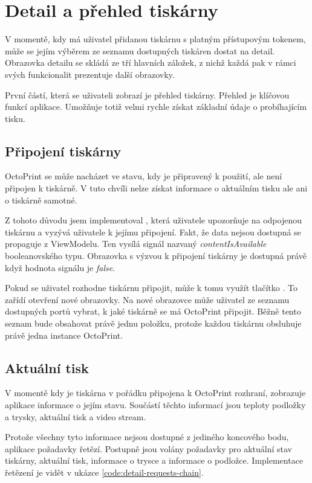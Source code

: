 \section{Detail a přehled tiskárny}

V momentě, kdy má uživatel přidanou tiskárnu s platným přístupovým tokenem, může se jejím výběrem ze seznamu dostupných tiskáren dostat na detail.
Obrazovka detailu se skládá ze tří hlavních záložek, z nichž každá pak v rámci svých funkcionalit prezentuje další obrazovky.

První částí, která se uživateli zobrazí je přehled tiskárny.
Přehled je klíčovou funkcí aplikace.
Umožňuje totiž velmi rychle získat základní údaje o probíhajícím tisku.

\subsection{Připojení tiskárny}

OctoPrint se může nacházet ve stavu, kdy je připravený k použití, ale není připojen k tiskárně.
V tuto chvíli nelze získat informace o aktuálním tisku ale ani o tiskárně samotné.

Z tohoto důvodu jsem implementoval , která uživatele upozorňuje na odpojenou tiskárnu a vyzývá uživatele k jejímu připojení.
Fakt, že data nejsou dostupná se propaguje z ViewModelu.
Ten vysílá signál nazvaný \textit{contentIsAvailable} booleanovského typu.
Obrazovka s výzvou k připojení tiskárny je dostupná právě když hodnota signálu je \textit{false}.

Pokud se uživatel rozhodne tiskárnu připojit, může k tomu využít tlačítko .
To zařídí otevření nové obrazovky.
Na nové obrazovce může uživatel ze seznamu dostupných portů vybrat, k jaké tiskárně se má OctoPrint připojit.
Běžně tento seznam bude obsahovat právě jednu položku, protože každou tiskárnu obsluhuje právě jedna instance OctoPrint.

\subsection{Aktuální tisk}

V momentě kdy je tiskárna v pořádku připojena k OctoPrint rozhraní, zobrazuje aplikace informace o jejím stavu.
Součástí těchto informací jsou teploty podložky a trysky, aktuální tisk a video stream.

Protože všechny tyto informace nejsou dostupné z jediného koncového bodu, aplikace požadavky řetězí.
Postupně jsou volány požadavky pro aktuální stav tiskárny, aktuální tisk, informace o trysce a informace o podložce.
Implementace řetězení je vidět v ukázce \ref{code:detail-requests-chain}.

